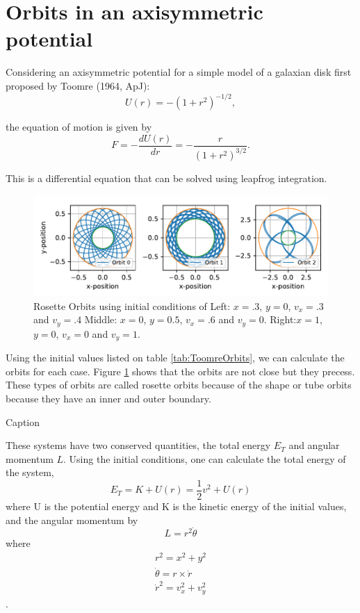 \section{Orbits in an axisymmetric potential}
Considering an axisymmetric potential for a simple model of a galaxian disk first proposed by Toomre (1964, ApJ):
\begin{equation}
    U(r) = -(1+r^2)^{-1/2},
\end{equation}

the equation of motion is given by
\begin{equation}
    F=-\frac{dU(r)}{dr}=-\frac{r}{(1+r^2)^{3/2}}.
\end{equation}

This is a differential equation that can be solved using leapfrog integration.

\begin{figure}[h!]
    \centering
    \includegraphics{CodeAndFigures/ToomrePotentialOrbits.pdf}
    \caption{Rosette Orbits using initial conditions of Left: $x=.3$, $y=0$, $v_x=.3$ and $v_y=.4$ Middle: $x=0$, $y=0.5$, $v_x=.6$ and $v_y=0$. Right:$x=1$, $y=0$, $v_x=0$ and $v_y=1$.}
    \label{fig:ToomreOrbits}
\end{figure}

Using the initial values listed on table \ref{tab:ToomreOrbits}, we can calculate the orbits for each case. Figure \ref{fig:ToomreOrbits} shows that the orbits are not close but they precess. These types of orbits are called rosette orbits because of the shape or tube orbits because they have an inner and outer boundary.

\begin{table}[]
    \centering

    \caption{Caption}
    \label{tab:ToomreOrbitIV}
\end{table}

These systems have two conserved quantities, the total energy $E_T$ and angular momentum $L$. Using the initial conditions, one can calculate the total energy of the system,
\begin{equation}
    E_T=K + U(r) = \frac{1}{2}v^2 + U(r)
\end{equation}
where U is the potential energy and K is the kinetic energy of the initial values, and the angular momentum by
\begin{equation}
    L=r^2\Dot{\theta}
\end{equation}
where 
\begin{align}
    r^2 = x^2 + y^2\\
    \Dot{\theta} = r \times \dot{r}\\
    \dot{r}^2 = v_x^2 + v_y^2
\end{align}.

